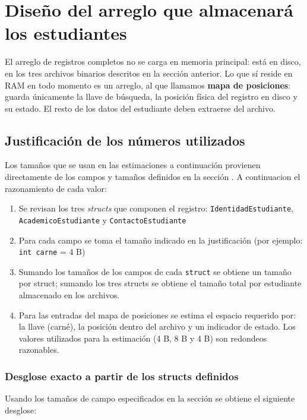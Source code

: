 \section{Diseño del arreglo que almacenará los estudiantes}
\label{sec:diseno-arreglo}

El arreglo de registros completos no se carga en memoria principal: está en disco, en los tres archivos binarios descritos en la sección anterior.
Lo que sí reside en RAM en todo momento es un arreglo, al que llamamos \textbf{mapa de posiciones}: 
guarda únicamente la llave de búsqueda, la posición física del registro en disco y su estado.
El resto de los datos del estudiante deben extraerse del archivo.

\subsection{Justificación de los números utilizados}

Los tamaños que se usan en las estimaciones a continuación provienen directamente de los campos y tamaños definidos
en la sección . A continuacion el razonamiento de cada valor:

\begin{enumerate}
    \item Se revisan los tres \emph{structs} que componen el registro: \texttt{IdentidadEstudiante}, \texttt{AcademicoEstudiante} y \texttt{ContactoEstudiante}
    \item Para cada campo se toma el tamaño indicado en la justificación (por ejemplo: \texttt{int carne} = 4 B)
    \item Sumando los tamaños de los campos de cada \texttt{struct} se obtiene un tamaño por struct; 
        sumando los tres structs se obtiene el tamaño total por estudiante almacenado en los archivos.
    \item Para las entradas del mapa de posiciones se estima el espacio requerido por: la llave (carné), la posición dentro del archivo y un indicador de estado. 
        Los valores utilizados para la estimación (4 B, 8 B y 4 B) son redondeos razonables.
\end{enumerate}

\subsubsection{Desglose exacto a partir de los structs definidos}

Usando los tamaños de campo especificados en la sección  se obtiene el siguiente desglose:

